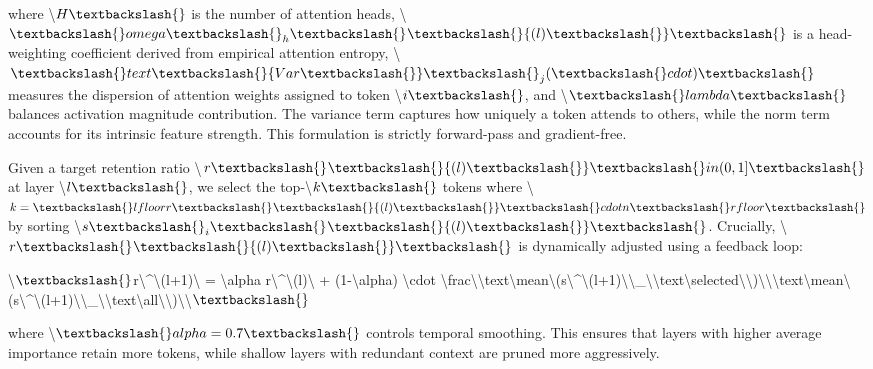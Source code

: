 \documentclass[11pt,a4paper]{article}
\begin{document}
where \textbackslash{}$H\textbackslash{}$ is the number of attention heads, \textbackslash{}$\textbackslash{}omega\textbackslash{}_h\textbackslash{}^{}\textbackslash{}{(l)\textbackslash{}}\textbackslash{}$ is a head-weighting coefficient derived from empirical attention entropy, \textbackslash{}$\textbackslash{}text\textbackslash{}{Var\textbackslash{}}\textbackslash{}_j(\textbackslash{}cdot)\textbackslash{}$ measures the dispersion of attention weights assigned to token \textbackslash{}$i\textbackslash{}$, and \textbackslash{}$\textbackslash{}lambda\textbackslash{}$ balances activation magnitude contribution. The variance term captures how uniquely a token attends to others, while the norm term accounts for its intrinsic feature strength. This formulation is strictly forward-pass and gradient-free.

Given a target retention ratio \textbackslash{}$r\textbackslash{}^{}\textbackslash{}{(l)\textbackslash{}} \textbackslash{}in (0,1]\textbackslash{}$ at layer \textbackslash{}$l\textbackslash{}$, we select the top-\textbackslash{}$k\textbackslash{}$ tokens where \textbackslash{}$k = \textbackslash{}lfloor r\textbackslash{}^{}\textbackslash{}{(l)\textbackslash{}} \textbackslash{}cdot n \textbackslash{}rfloor\textbackslash{}$ by sorting \textbackslash{}$s\textbackslash{}_i\textbackslash{}^{}\textbackslash{}{(l)\textbackslash{}}\textbackslash{}$. Crucially, \textbackslash{}$r\textbackslash{}^{}\textbackslash{}{(l)\textbackslash{}}\textbackslash{}$ is dynamically adjusted using a feedback loop:

\textbackslash{}$\textbackslash{}$r\textbackslash{}^{}\textbackslash{}{(l+1)\textbackslash{}} = \textbackslash{}alpha r\textbackslash{}^{}\textbackslash{}{(l)\textbackslash{}} + (1-\textbackslash{}alpha) \textbackslash{}cdot \textbackslash{}frac\textbackslash{}{\textbackslash{}text\textbackslash{}{mean\textbackslash{}}(s\textbackslash{}^{}\textbackslash{}{(l+1)\textbackslash{}}\textbackslash{}_\textbackslash{}{\textbackslash{}text\textbackslash{}{selected\textbackslash{}}\textbackslash{}})\textbackslash{}}\textbackslash{}{\textbackslash{}text\textbackslash{}{mean\textbackslash{}}(s\textbackslash{}^{}\textbackslash{}{(l+1)\textbackslash{}}\textbackslash{}_\textbackslash{}{\textbackslash{}text\textbackslash{}{all\textbackslash{}}\textbackslash{}})\textbackslash{}}\textbackslash{}$\textbackslash{}$

where \textbackslash{}$\textbackslash{}alpha=0.7\textbackslash{}$ controls temporal smoothing. This ensures that layers with higher average importance retain more tokens, while shallow layers with redundant context are pruned more aggressively.
\end{document}
